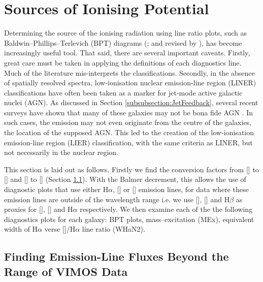 \section{Sources of Ionising Potential}
	\label{sec:Diagnostics}
	Determining the source of the ionising radiation using line ratio plots, such as Baldwin--Phillips--Terlevich (BPT) diagrams (\citealt{Baldwin1981}; and revised by \citealt{Kewley2001, Kauffmann2003a}), has become increasingly useful tool. That said, there are several important caveats. Firstly, great care must be taken in applying the definitions of each diagnostics line. Much of the literature mis-interprets the classifications. Secondly, in the absence of spatially resolved spectra, low-ionisation nuclear emission-line region (LINER) classifications have often been taken as a marker for jet-mode active galactic nuclei (AGN). As discussed in Section \ref{subsubsection:JetFeedback}, several recent surveys have shown that many of these galaxies may not be bona fide AGN \citep[e.g.][]{Sarzi2005, Sarzi2010, Singh2013, Belfiore2016a}. In such cases, the emission may not even originate from the centre of the galaxies, the location of the supposed AGN. This led to the creation of the low-ionisation emission-line region (LIER) classification, with the same criteria as LINER, but not necessarily in the nuclear region.

	This section is laid out as follows. Firstly we find the conversion factors from [] to [] and [] to [] (Section \ref{subsec:Ndec}). With the Balmer decrement, this allows the use of diagnostic plots that use either H$\alpha$, [] or [] emission lines, for data where these emission lines are outside of the wavelength range i.e. we use [], [] and H$\beta$ as proxies for [], [] and H$\alpha$ respectively. We then examine each of the the following diagnostics plots for each galaxy: BPT plots, mass--excitation (MEx), equivalent width of H$\alpha$ verse []/H$\alpha$ line ratio (WHaN2).%

	\subsection{Finding Emission-Line Fluxes Beyond the Range of VIMOS Data}
		\label{subsec:Ndec}

